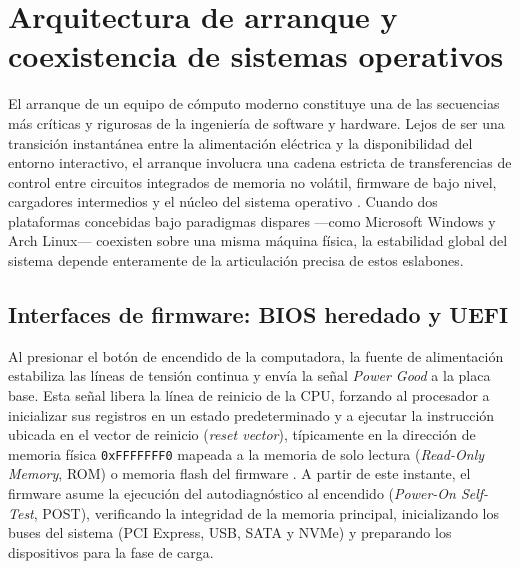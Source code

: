\documentclass[12pt]{article}
\begin{document}
\section{Arquitectura de arranque y coexistencia de sistemas operativos}
\label{sec:arquitecturaArranque}

El arranque de un equipo de cómputo moderno constituye una de las secuencias más críticas y rigurosas de la ingeniería de software y hardware. Lejos de ser una transición instantánea entre la alimentación eléctrica y la disponibilidad del entorno interactivo, el arranque involucra una cadena estricta de transferencias de control entre circuitos integrados de memoria no volátil, firmware de bajo nivel, cargadores intermedios y el núcleo del sistema operativo \parencite[\S 2.4.3, pp.\ 76--77]{deitel2004operating}. Cuando dos plataformas concebidas bajo paradigmas dispares —como Microsoft Windows y Arch Linux— coexisten sobre una misma máquina física, la estabilidad global del sistema depende enteramente de la articulación precisa de estos eslabones.

\subsection{Interfaces de firmware: BIOS heredado y UEFI}
\label{sec:interfacesFirmware}

Al presionar el botón de encendido de la computadora, la fuente de alimentación estabiliza las líneas de tensión continua y envía la señal \textit{Power Good} a la placa base. Esta señal libera la línea de reinicio de la CPU, forzando al procesador a inicializar sus registros en un estado predeterminado y a ejecutar la instrucción ubicada en el vector de reinicio (\textit{reset vector}), típicamente en la dirección de memoria física \texttt{0xFFFFFFF0} mapeada a la memoria de solo lectura (\textit{Read-Only Memory}, ROM) o memoria flash del firmware \parencite[\S 12.5.2, pp.\ 419--420]{silberschatz2006fundamentos}. A partir de este instante, el firmware asume la ejecución del autodiagnóstico al encendido (\textit{Power-On Self-Test}, POST), verificando la integridad de la memoria principal, inicializando los buses del sistema (PCI Express, USB, SATA y NVMe) y preparando los dispositivos para la fase de carga.
\end{document}

